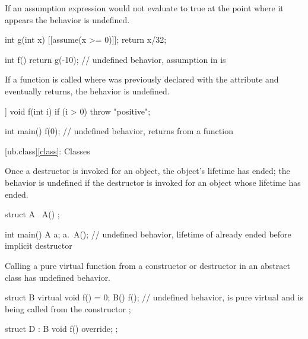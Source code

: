 
\pnum
If an assumption expression would not evaluate to true at the point where it
appears the behavior is undefined.

\pnum
\begin{example}
\begin{codeblock}
int g(int x) {
  [[assume(x >= 0)]];
  return x/32;
}

int f() {
  return g(-10);    // undefined behavior, assumption in  is 
}
\end{codeblock}
\end{example}


\pnum
If a function  is called
where  was previously declared
with the  attribute and
 eventually returns,
the behavior is undefined.

\pnum
\begin{example}
\begin{codeblock}
[[noreturn]] void f(int i) {
  if (i > 0)
    throw "positive";
}

int main() {
  f(0);         // undefined behavior, returns from a \tcode{[[noreturn]]} function
}
\end{codeblock}
\end{example}

[ub.class]{\ref*{class}: Classes}


\pnum
Once a destructor is invoked for an object,
the object's lifetime has ended;
the behavior is undefined if the
destructor is invoked for an object whose lifetime has ended.

\pnum
\begin{example}
\begin{codeblock}
struct A {
  ~A() {}
};

int main() {
  A a;
  a.~A();
}   // undefined behavior, lifetime of  already ended before implicit destructor
\end{codeblock}
\end{example}


\pnum
Calling a pure virtual function from a constructor or destructor
in an abstract class has undefined behavior.

\pnum
\begin{example}
\begin{codeblock}
struct B {
  virtual void f() = 0;
  B() {
    f();        // undefined behavior,  is pure virtual and is being called from the constructor
  }
};

struct D : B {
  void f() override;
};
\end{codeblock}
\end{example}

